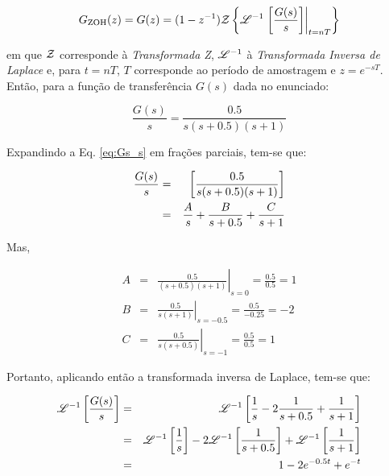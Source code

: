 \begin{equation}\label{eq:Gzoh}
G_{\text{ZOH}}(z) = 
G(z) = (1 - z^{-1})
       \mathcal{Z}\left\{\mathscr{L}^{-1}\left.\left[\frac{G(s)}{s}\right]\right|_{t = nT}\right\}
\end{equation}

\noindent em que $\mathcal{Z}$ corresponde à {\it Transformada Z}, $\mathscr{L}^{-1}$ à {\it
Transformada Inversa de Laplace} e, para $t = nT$, $T$ corresponde ao período de
amostragem e $z = e^{-sT}$. Então, para a função de transferência $G(s)$ dada no
enunciado:

\begin{equation}\label{eq:Gs_s}
\frac{G(s)}{s} = \frac{0.5}{s(s+0.5)(s+1)}
\end{equation}

Expandindo a Eq. \ref{eq:Gs_s} em frações parciais, tem-se que:

\begin{eqnarray}\label{eq:frac_parc}
\frac{G(s)}{s} & = & \left[\frac{0.5}{s(s+0.5)(s+1)}\right]\nonumber\\
& = & \frac{A}{s} + \frac{B}{s+0.5} + \frac{C}{s+1}\nonumber\\
\end{eqnarray}

Mas,

\begin{eqnarray}
A & = & \left.\frac{0.5}{(s+0.5)(s+1)}\right|_{s = 0} = \frac{0.5}{0.5} = 
                                                    1\nonumber\\
B & = & \left.\frac{0.5}{s(s+1)}\right|_{s = -0.5} = \frac{0.5}{-0.25} = 
                                                 -2\nonumber\\
C & = & \left.\frac{0.5}{s(s+0.5)}\right|_{s = -1} = \frac{0.5}{0.5} = 
                                                     1\nonumber
\end{eqnarray}

Portanto, aplicando então a transformada inversa de Laplace, tem-se que:

\begin{eqnarray}
\mathscr{L}^{-1}\left[\frac{G(s)}{s}\right]
& = & \mathscr{L}^{-1}\left[\frac{1}{s} - 
                         2\frac{1}{s+0.5} + 
                         \frac{1}{s+1}\right]\nonumber\\
& = & \mathscr{L}^{-1}\left[\frac{1}{s}\right] - 
      2\mathscr{L}^{-1}\left[\frac{1}{s+0.5}\right] + 
      \mathscr{L}^{-1}\left[\frac{1}{s+1}\right]\nonumber\\
& = & 1 - 2e^{-0.5t} + e^{-t}\label{eq:ilaplace}
\end{eqnarray}

